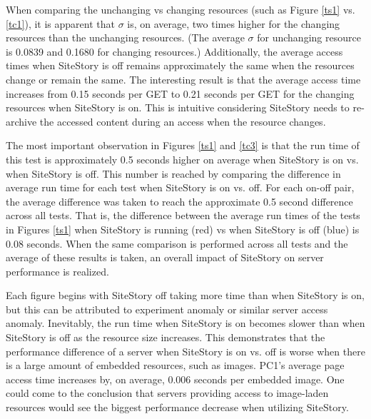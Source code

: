 \documentclass[runningheads,a4paper]{llncs}
\begin{document}
When comparing the unchanging vs changing resources (such as Figure \ref{ts1} vs. \ref{tc1}), it is apparent that  $\sigma$ is, on average, two times higher for the changing resources than the unchanging resources. (The average $\sigma$ for unchanging resource is 0.0839 and 0.1680 for changing resources.) Additionally, the average access times when SiteStory is off remains approximately the same when the resources change or remain the same. The interesting result is that the average access time increases from 0.15 seconds per GET to 0.21 seconds per GET for the changing resources when SiteStory is on. This is intuitive considering SiteStory needs to re-archive the accessed content during an access when the resource changes. 


The most important observation in Figures \ref{ts1} and \ref{tc3} is that the run time of this test is approximately 0.5 seconds higher on average when SiteStory is on vs. when SiteStory is off. This number is reached by comparing the difference in average run time for each test when SiteStory is on vs. off. For each on-off pair, the average difference was taken to reach the approximate 0.5 second difference across all tests. That is, the difference between the average run times of the tests in Figures \ref{ts1} when SiteStory is running (red) vs when SiteStory is off (blue) is 0.08 seconds. When the same comparison is performed across all tests and the average of these results is taken, an overall impact of SiteStory on server performance is realized.

Each figure begins with SiteStory off taking more time than when SiteStory is on, but this can be attributed to experiment anomaly or similar server access anomaly. Inevitably, the run time when SiteStory is on becomes slower than when SiteStory is off as the resource size increases. This demonstrates that the performance difference of a server when SiteStory is on vs. off is worse when there is a large amount of embedded resources, such as images. PC1's average page access time increases by, on average, 0.006 seconds per embedded image. One could come to the conclusion that servers providing access to image-laden resources would see the biggest performance decrease when utilizing SiteStory. 
\end{document}
